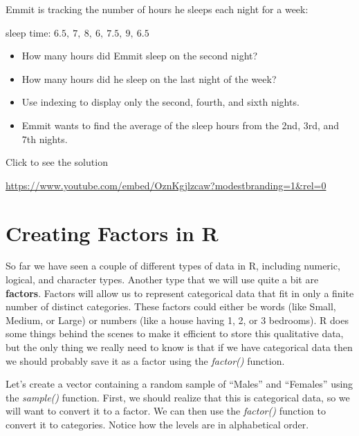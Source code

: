 \documentclass[
  letterpaper,
  DIV=11,
  numbers=noendperiod]{scrreprt}
\providecommand{\tightlist}{%
  \setlength{\itemsep}{0pt}\setlength{\parskip}{0pt}}
\begin{document}
\begin{tcolorbox}[enhanced jigsaw, colframe=quarto-callout-tip-color-frame, colback=white, breakable, rightrule=.15mm, title=\textcolor{quarto-callout-tip-color}{\faLightbulb}\hspace{0.5em}{Try it Out}, bottomtitle=1mm, toptitle=1mm, titlerule=0mm, left=2mm, coltitle=black, colbacktitle=quarto-callout-tip-color!10!white, leftrule=.75mm, opacitybacktitle=0.6, bottomrule=.15mm, opacityback=0, arc=.35mm, toprule=.15mm]

Emmit is tracking the number of hours he sleeps each night for a week:

sleep time: \(6.5,\ 7,\ 8,\ 6,\ 7.5,\ 9,\ 6.5\)

\begin{itemize}
\tightlist
\item
  How many hours did Emmit sleep on the second night?
\item
  How many hours did he sleep on the last night of the week?
\item
  Use indexing to display only the second, fourth, and sixth nights.
\item
  Emmit wants to find the average of the sleep hours from the 2nd, 3rd,
  and 7th nights.
\end{itemize}

Click to see the solution

\url{https://www.youtube.com/embed/OznKgjlzcaw?modestbranding=1&rel=0}

\end{tcolorbox}

\section{Creating Factors in R}\label{creating-factors-in-r}

So far we have seen a couple of different types of data in R, including
numeric, logical, and character types. Another type that we will use
quite a bit are \textbf{factors}. Factors will allow us to represent
categorical data that fit in only a finite number of distinct
categories. These factors could either be words (like Small, Medium, or
Large) or numbers (like a house having 1, 2, or 3 bedrooms). R does some
things behind the scenes to make it efficient to store this qualitative
data, but the only thing we really need to know is that if we have
categorical data then we should probably save it as a factor using the
\emph{factor()} function.

Let's create a vector containing a random sample of ``Males'' and
``Females'' using the \emph{sample()} function. First, we should realize
that this is categorical data, so we will want to convert it to a
factor. We can then use the \emph{factor()} function to convert it to
categories. Notice how the levels are in alphabetical order.
\end{document}
